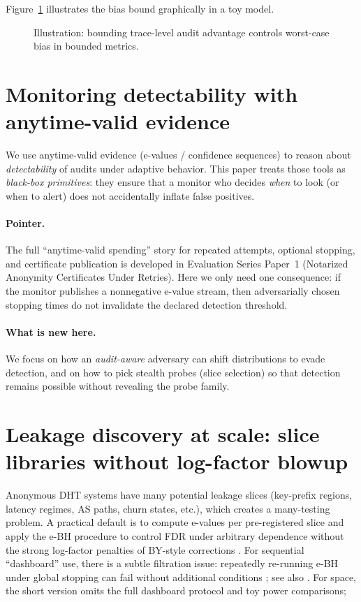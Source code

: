 \documentclass[11pt]{article}
\begin{document}
Figure~\ref{fig:adv_contract_bias} illustrates the bias bound graphically in a toy model.

\begin{figure}[t]
\centering
{}
\caption{Illustration: bounding trace-level audit advantage controls worst-case bias in bounded metrics.}
\label{fig:adv_contract_bias}
\end{figure}

\section{Monitoring detectability with anytime-valid evidence}
We use anytime-valid evidence (e-values / confidence sequences) to reason about \emph{detectability} of audits under adaptive behavior.
This paper treats those tools as \emph{black-box primitives}: they ensure that a monitor who decides \emph{when} to look (or when to alert) does not accidentally inflate false positives.

\paragraph{Pointer.}
The full ``anytime-valid spending'' story for repeated attempts, optional stopping, and certificate publication is developed in Evaluation Series Paper~1 (Notarized Anonymity Certificates Under Retries).
Here we only need one consequence: if the monitor publishes a nonnegative e-value stream, then adversarially chosen stopping times do not invalidate the declared detection threshold.

\paragraph{What is new here.}
We focus on how an \emph{audit-aware} adversary can shift distributions to evade detection, and on how to pick stealth probes (slice selection) so that detection remains possible without revealing the probe family.

\section{Leakage discovery at scale: slice libraries without log-factor blowup}
Anonymous DHT systems have many potential leakage slices (key-prefix regions, latency regimes, AS paths, churn states, etc.), which creates a many-testing problem.
A practical default is to compute e-values per pre-registered slice and apply the e-BH procedure \cite{wangramdas2022ebh} to control FDR under arbitrary dependence without the strong log-factor penalties of BY-style corrections \cite{benjamini2001by}.
For sequential ``dashboard'' use, there is a subtle filtration issue: repeatedly re-running e-BH under global stopping can fail without additional conditions \cite{stopped_ebh_2025}; see also \cite{xu2024online_evalues}.
For space, the short version omits the full dashboard protocol and toy power comparisons; 
\end{document}
